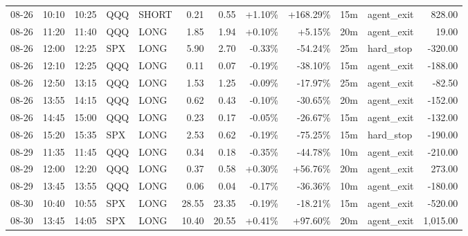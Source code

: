 \documentclass[11pt,a4paper]{article}
\begin{document}
\begin{center}
\begin{longtable}{>{\color{txtmain}}l l l l l r r r r r >{\color{txtmain}}l r}
08-26 & 10:10 & 10:25 & QQQ & SHORT & 0.21 & 0.55 & \textcolor{wingreen}{+1.10\%} & \textcolor{wingreen}{+168.29\%} & 15m & agent\_exit & \textcolor{wingreen}{828.00} \\
08-26 & 11:20 & 11:40 & QQQ & LONG & 1.85 & 1.94 & \textcolor{wingreen}{+0.10\%} & \textcolor{wingreen}{+5.15\%} & 20m & agent\_exit & \textcolor{wingreen}{19.00} \\
08-26 & 12:00 & 12:25 & SPX & LONG & 5.90 & 2.70 & \textcolor{lossred}{-0.33\%} & \textcolor{lossred}{-54.24\%} & 25m & hard\_stop & \textcolor{lossred}{-320.00} \\
08-26 & 12:10 & 12:25 & QQQ & LONG & 0.11 & 0.07 & \textcolor{lossred}{-0.19\%} & \textcolor{lossred}{-38.10\%} & 15m & agent\_exit & \textcolor{lossred}{-188.00} \\
08-26 & 12:50 & 13:15 & QQQ & LONG & 1.53 & 1.25 & \textcolor{lossred}{-0.09\%} & \textcolor{lossred}{-17.97\%} & 25m & agent\_exit & \textcolor{lossred}{-82.50} \\
08-26 & 13:55 & 14:15 & QQQ & LONG & 0.62 & 0.43 & \textcolor{lossred}{-0.10\%} & \textcolor{lossred}{-30.65\%} & 20m & agent\_exit & \textcolor{lossred}{-152.00} \\
08-26 & 14:45 & 15:00 & QQQ & LONG & 0.23 & 0.17 & \textcolor{lossred}{-0.05\%} & \textcolor{lossred}{-26.67\%} & 15m & agent\_exit & \textcolor{lossred}{-132.00} \\
08-26 & 15:20 & 15:35 & SPX & LONG & 2.53 & 0.62 & \textcolor{lossred}{-0.19\%} & \textcolor{lossred}{-75.25\%} & 15m & hard\_stop & \textcolor{lossred}{-190.00} \\
08-29 & 11:35 & 11:45 & QQQ & LONG & 0.34 & 0.18 & \textcolor{lossred}{-0.35\%} & \textcolor{lossred}{-44.78\%} & 10m & agent\_exit & \textcolor{lossred}{-210.00} \\
08-29 & 12:00 & 12:20 & QQQ & LONG & 0.37 & 0.58 & \textcolor{wingreen}{+0.30\%} & \textcolor{wingreen}{+56.76\%} & 20m & agent\_exit & \textcolor{wingreen}{273.00} \\
08-29 & 13:45 & 13:55 & QQQ & LONG & 0.06 & 0.04 & \textcolor{lossred}{-0.17\%} & \textcolor{lossred}{-36.36\%} & 10m & agent\_exit & \textcolor{lossred}{-180.00} \\
08-30 & 10:40 & 10:55 & SPX & LONG & 28.55 & 23.35 & \textcolor{lossred}{-0.19\%} & \textcolor{lossred}{-18.21\%} & 15m & agent\_exit & \textcolor{lossred}{-520.00} \\
08-30 & 13:45 & 14:05 & SPX & LONG & 10.40 & 20.55 & \textcolor{wingreen}{+0.41\%} & \textcolor{wingreen}{+97.60\%} & 20m & agent\_exit & \textcolor{wingreen}{1,015.00} \\

\end{longtable}
\end{center}
\end{document}
